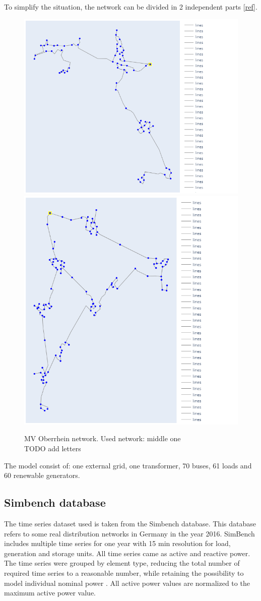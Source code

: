 To simplify the situation, the network can be divided in 2 independent parts [\href{https://kobra.uni-kassel.de/bitstream/handle/123456789/12005/kup_9783737608725.pdf?sequence=1&isAllowed=y}{ref}].

\begin{figure}[h]
\centering
    \includegraphics[height=0.33\linewidth,width=.32\linewidth]{images/MVOberr/Half1.png}
    \includegraphics[height=0.33\linewidth,width=.32\linewidth]{images/MVOberr/Half2.png}
\caption{MV Oberrhein network. Used network: middle one \\
TODO add letters}
\label{fig:gym_anm_net}
\end{figure}

The model consist of: one external grid, one transformer, 70 buses, 61 loads and 60 renewable generators.

\subsection{Simbench database}
\label{simdata}
The time series dataset used is taken from the Simbench database. This database refers to some real distribution networks in Germany in the year 2016. SimBench includes multiple time series for one year with 15 min resolution for load, generation and storage units. All time series came as active and reactive power. The time series were grouped by element type, reducing the total number of required time series to a reasonable number, while retaining the possibility to model individual nominal power \cite{Simbenchds0}. All active power values are normalized to the maximum active power value.\\

